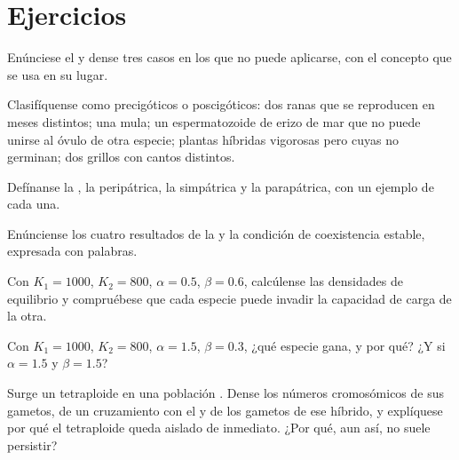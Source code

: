 \section{Ejercicios}

\begin{exercise}[$\star$]\label{exo:b2:speciation:1}
Enúnciese el  y dense tres casos en los que
no puede aplicarse, con el concepto que se usa en su lugar.
\end{exercise}

\begin{exercise}[$\star$]\label{exo:b2:speciation:2}
Clasifíquense como precigóticos o poscigóticos: dos ranas que se
reproducen en meses distintos; una mula; un espermatozoide de erizo de mar
que no puede unirse al óvulo de otra especie; plantas híbridas vigorosas
pero cuyas  no germinan; dos grillos con cantos distintos.
\end{exercise}

\begin{exercise}[$\star$]\label{exo:b2:speciation:3}
Defínanse la , la peripátrica, la simpátrica y la
parapátrica, con un ejemplo de cada una.
\end{exercise}

\begin{exercise}[$\star$]\label{exo:b2:speciation:4}
Enúnciense los cuatro resultados de la  y la
condición de coexistencia estable, expresada con palabras.
\end{exercise}

\begin{exercise}[$\star\star$]\label{exo:b2:speciation:5}
Con $K_1 = 1000$, $K_2 = 800$, $\alpha = 0.5$, $\beta = 0.6$,
calcúlense las densidades de equilibrio y compruébese que cada especie
puede invadir la capacidad de carga de la otra.
\end{exercise}

\begin{exercise}[$\star\star$]\label{exo:b2:speciation:6}
Con $K_1 = 1000$, $K_2 = 800$, $\alpha = 1.5$, $\beta = 0.3$, ¿qué
especie gana, y por qué? ¿Y si $\alpha = 1.5$ y $\beta = 1.5$?
\end{exercise}

\begin{exercise}[$\star\star$]\label{exo:b2:speciation:7}
Surge un tetraploide en una población . Dense los números
cromosómicos de sus gametos, de un cruzamiento con el  y de los
gametos de ese híbrido, y explíquese por qué el tetraploide queda aislado
de inmediato. ¿Por qué, aun así, no suele persistir?
\end{exercise}

